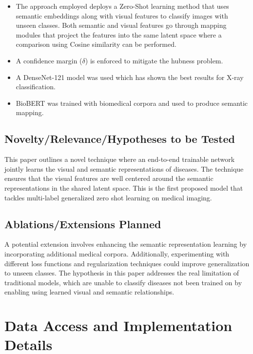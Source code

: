\documentclass[letterpaper]{article} %
\begin{document}
\begin{itemize}
    \item The approach employed deploys a Zero-Shot learning method that uses semantic embeddings along with visual features to classify images with unseen classes. Both semantic and visual features go through mapping modules that project the features into the same latent space where a comparison using Cosine similarity can be performed.
    \item  A confidence margin (\( \delta \)) is enforced to mitigate the hubness problem.
    \item A DenseNet-121 model was used which has shown the best results for X-ray classification.
    \item BioBERT was trained with biomedical corpora and used to produce semantic mapping.
\end{itemize}

\subsection{Novelty/Relevance/Hypotheses to be Tested}

This paper outlines a novel technique where an end-to-end trainable network jointly
learns the visual and semantic representations of diseases. The technique ensures that
the visual features are well centered around the semantic representations in the
shared latent space. This is the first proposed model that tackles multi-label
generalized zero shot learning on medical imaging.

\subsection{Ablations/Extensions Planned}

A potential extension involves enhancing the semantic representation learning by
incorporating additional medical corpora. Additionally, experimenting with different
loss functions and regularization techniques could improve generalization to
unseen classes. The hypothesis in this paper addresses the real limitation of
traditional models, which are unable to classify diseases not been trained on by
enabling using learned visual and semantic relationships.

\section{Data Access and Implementation Details}
\end{document}
